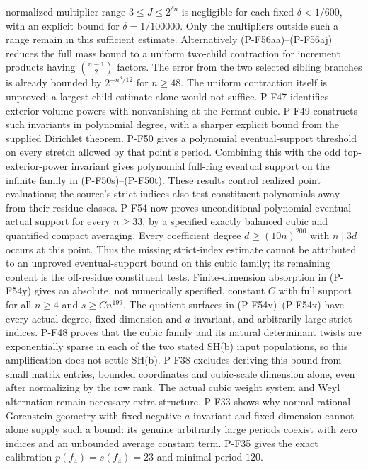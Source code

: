 \documentclass[11pt,a4paper]{article}
\begin{document}
\begin{description}
normalized multiplier range $3\le J\le2^{\delta n}$ is
negligible for each fixed $\delta<1/600$, with an explicit
bound for $\delta=1/100000$. Only the multipliers outside
such a range remain in this sufficient estimate.
Alternatively (P-F56aa)--(P-F56aj) reduces the full mass
bound to a uniform two-child contraction for increment
products having $\binom{n-1}{2}$ factors. The error from
the two selected sibling branches is already bounded by
$2^{-n^3/12}$ for $n\ge48$. The uniform contraction itself
is unproved; a largest-child estimate alone would not suffice.
P-F47 identifies exterior-volume powers with nonvanishing at the
Fermat cubic. P-F49 constructs such invariants in polynomial
degree, with a sharper explicit bound from the supplied Dirichlet
theorem. P-F50 gives a polynomial eventual-support threshold on
every stretch allowed by that point's period. Combining this
with the odd top-exterior-power invariant gives polynomial
full-ring eventual support on the infinite family in
(P-F50s)--(P-F50t). These results
control realized point evaluations; the source's strict indices
also test constituent polynomials away from their residue classes.
P-F54 now proves unconditional polynomial eventual actual support
for every $n\ge33$, by a specified exactly balanced cubic and
quantified compact averaging. Every coefficient degree
$d\ge(10n)^{200}$ with $n\mid3d$ occurs at this point. Thus
the missing strict-index estimate cannot be attributed to an
unproved eventual-support bound on this cubic family; its
remaining content is the off-residue constituent tests.
Finite-dimension absorption in (P-F54y) gives an absolute,
not numerically specified, constant $C$ with full support for
all $n\ge4$ and $s\ge Cn^{199}$. The quotient surfaces in
(P-F54v)--(P-F54x) have every actual degree, fixed dimension
and $a$-invariant, and arbitrarily large strict indices.
P-F48 proves that the cubic family and its natural determinant
twists are exponentially sparse in each of the two stated SH(b)
input populations, so this amplification does not settle SH(b).
P-F38 excludes deriving this bound from small matrix entries, bounded
coordinates and cubic-scale dimension alone, even after normalizing by
the row rank. The actual cubic weight system and Weyl alternation remain
necessary extra structure. P-F33 shows why normal rational Gorenstein geometry with fixed
negative $a$-invariant and fixed dimension cannot alone supply
such a bound: its genuine arbitrarily large periods coexist with
zero indices and an unbounded average constant term. P-F35 gives
the exact calibration $p(f_4)=s(f_4)=23$ and minimal period $120$.


\end{description}
\end{document}
